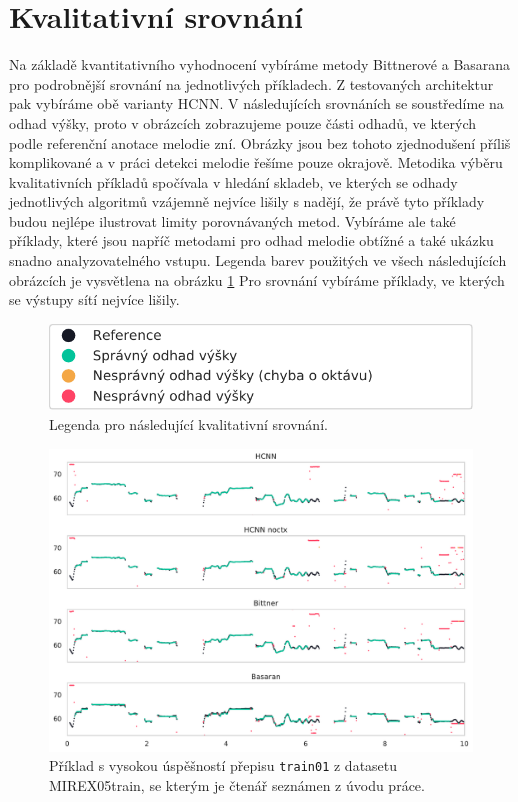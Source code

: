\section{Kvalitativní srovnání}

Na základě kvantitativního vyhodnocení vybíráme metody Bittnerové a Basarana pro podrobnější srovnání na jednotlivých příkladech. Z testovaných architektur pak vybíráme obě varianty HCNN. V následujících srovnáních se soustředíme na odhad výšky, proto v obrázcích zobrazujeme pouze části odhadů, ve kterých podle referenční anotace melodie zní. Obrázky jsou bez tohoto zjednodušení příliš komplikované a v práci detekci melodie řešíme pouze okrajově. Metodika výběru kvalitativních příkladů spočívala v hledání skladeb, ve kterých se odhady jednotlivých algoritmů vzájemně nejvíce lišily s nadějí, že právě tyto příklady budou nejlépe ilustrovat limity porovnávaných metod. Vybíráme ale také příklady, které jsou napříč metodami pro odhad melodie obtížné a také ukázku snadno analyzovatelného vstupu. Legenda barev použitých ve všech následujících obrázcích je vysvětlena na obrázku \ref{obr:legenda}
 Pro srovnání vybíráme příklady, ve kterých se výstupy sítí nejvíce lišily.

\begin{figure}[h]\centering
\includegraphics[scale=0.75]{../img/legenda}
\caption{Legenda pro následující kvalitativní srovnání.}
\label{obr:legenda}
\end{figure}

\begin{figure}[h]\centering
\includegraphics[width=\textwidth,height=\textheight,keepaspectratio]{../img/vysledky/mirex05_train01}
\caption{Příklad s vysokou úspěšností přepisu \texttt{train01} z datasetu MIREX05\-train, se kterým je čtenář seznámen z úvodu práce.}
\label{obr:mirex05_train01}
\end{figure}

